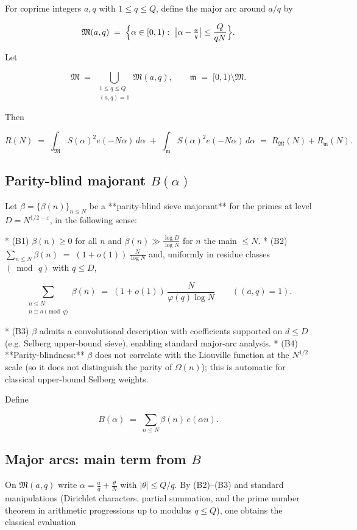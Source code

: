 \documentclass[11pt]{article}
\theoremstyle{definition}
\theoremstyle{remark}
\begin{document}
For coprime integers $a,q$ with $1\le q\le Q$, define the major arc around $a/q$ by

$$
\mathfrak M(a,q)\;=\;\Bigl\{\alpha\in[0,1):\ \bigl|\alpha-\tfrac{a}{q}\bigr|
\le \frac{Q}{qN}\Bigr\}.
$$

Let

$$
\mathfrak M\;=\;\bigcup_{\substack{1\le q\le Q\\ (a,q)=1}}\mathfrak M(a,q),
\qquad
\mathfrak m\;=\;[0,1)\setminus\mathfrak M .
$$

Then

$$
R(N)\;=\;\int_{\mathfrak M} S(\alpha)^2 e(-N\alpha)\,d\alpha\;+\;
\int_{\mathfrak m} S(\alpha)^2 e(-N\alpha)\,d\alpha
\;=\;R_{\mathfrak M}(N)+R_{\mathfrak m}(N).
$$


\subsection*{Parity-blind majorant $B(\alpha)$}

Let $\beta=\{\beta(n)\}_{n\le N}$ be a **parity-blind sieve majorant** for the primes at level $D=N^{1/2-\varepsilon}$, in the following sense:

* (B1) $\beta(n)\ge 0$ for all $n$ and $\beta(n)\gg \tfrac{\log D}{\log N}$ for $n$ the main $\le N$.
* (B2) $\displaystyle \sum_{n\le N}\beta(n)\;=\;(1+o(1))\,\frac{N}{\log N}$ and, uniformly in residue classes $(\bmod\,q)$ with $q\le D$,

$$
\sum_{\substack{n\le N\\ n\equiv a\!\!\!\pmod q}}\beta(n)
\;=\;(1+o(1))\,\frac{N}{\varphi(q)\log N}\qquad ((a,q)=1).
$$

* (B3) $\beta$ admits a convolutional description with coefficients supported on $d\le D$ (e.g. Selberg upper-bound sieve), enabling standard major-arc analysis.
* (B4) **Parity-blindness:** $\beta$ does not correlate with the Liouville function at the $N^{1/2}$ scale (so it does not distinguish the parity of $\Omega(n)$); this is automatic for classical upper-bound Selberg weights.

Define

$$
B(\alpha)\;=\;\sum_{n\le N}\beta(n)\,e(\alpha n).
$$


\subsection*{Major arcs: main term from $B$}

On $\mathfrak M(a,q)$ write $\alpha=\tfrac{a}{q}+\tfrac{\theta}{N}$ with
$|\theta|\le Q/q$. By (B2)–(B3) and standard manipulations (Dirichlet characters, partial summation, and the prime number theorem in arithmetic progressions up to modulus $q\le Q$), one obtains the classical evaluation
\end{document}
